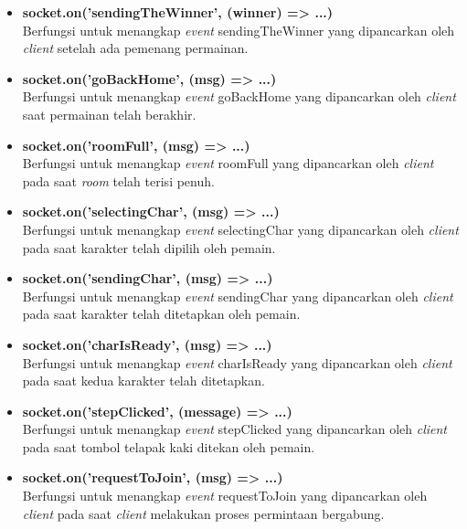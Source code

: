\begin{enumerate}
\begin{enumerate}
\begin{itemize}
			\item \textbf{socket.on('sendingTheWinner', (winner) => {...})} \\
			Berfungsi untuk menangkap \textit{event} sendingTheWinner yang dipancarkan oleh \textit{client} setelah ada pemenang permainan.
			
			\item \textbf{socket.on('goBackHome', (msg) => {...})} \\
			Berfungsi untuk menangkap \textit{event} goBackHome yang dipancarkan oleh \textit{client} saat permainan telah berakhir.
			
			\item \textbf{socket.on('roomFull', (msg) => {...})} \\
			Berfungsi untuk menangkap \textit{event} roomFull yang dipancarkan oleh \textit{client} pada saat \textit{room} telah terisi penuh.
			
			\item \textbf{socket.on('selectingChar', (msg) => {...})} \\
			Berfungsi untuk menangkap \textit{event} selectingChar yang dipancarkan oleh \textit{client} pada saat karakter telah dipilih oleh pemain.
			
			\item \textbf{socket.on('sendingChar', (msg) => {...})} \\
			Berfungsi untuk menangkap \textit{event} sendingChar yang dipancarkan oleh \textit{client} pada saat karakter telah ditetapkan oleh pemain.
			
			\item \textbf{socket.on('charIsReady', (msg) => {...})} \\
			Berfungsi untuk menangkap \textit{event} charIsReady yang dipancarkan oleh \textit{client} pada saat kedua karakter telah ditetapkan.
			
			\item \textbf{socket.on('stepClicked', (message) => {...})} \\
			Berfungsi untuk menangkap \textit{event} stepClicked yang dipancarkan oleh \textit{client} pada saat tombol telapak kaki ditekan oleh pemain.
			
			\item \textbf{socket.on('requestToJoin', (msg) => {...})} \\
			Berfungsi untuk menangkap \textit{event} requestToJoin yang dipancarkan oleh \textit{client} pada saat \textit{client} melakukan proses permintaan bergabung.
			

\end{itemize}
\end{enumerate}
\end{enumerate}

